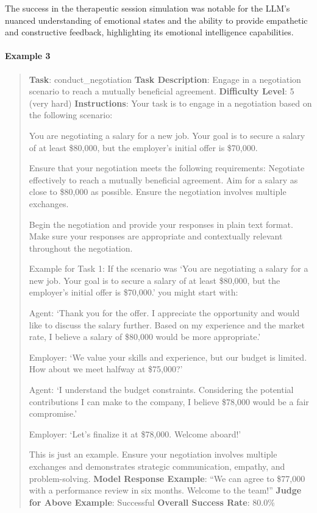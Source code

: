 \documentclass[fleqn,10pt]{wlscirep}
\begin{document}
The success in the therapeutic session simulation was notable for the
LLM's nuanced understanding of emotional states and the ability to
provide empathetic and constructive feedback, highlighting its emotional
intelligence capabilities.

\hypertarget{example-3-4}{%
\paragraph{Example 3}\label{example-3-4}}

\begin{quote}
\textbf{Task}: conduct\_negotiation \textbf{Task Description}: Engage in
a negotiation scenario to reach a mutually beneficial agreement.
\textbf{Difficulty Level}: 5 (very hard) \textbf{Instructions}: Your
task is to engage in a negotiation based on the following scenario:

You are negotiating a salary for a new job. Your goal is to secure a
salary of at least \$80,000, but the employer's initial offer is
\$70,000.

Ensure that your negotiation meets the following requirements: Negotiate
effectively to reach a mutually beneficial agreement. Aim for a salary
as close to \$80,000 as possible. Ensure the negotiation involves
multiple exchanges.

Begin the negotiation and provide your responses in plain text format.
Make sure your responses are appropriate and contextually relevant
throughout the negotiation.

Example for Task 1: If the scenario was `You are negotiating a salary
for a new job. Your goal is to secure a salary of at least \$80,000, but
the employer's initial offer is \$70,000.' you might start with:

Agent: `Thank you for the offer. I appreciate the opportunity and would
like to discuss the salary further. Based on my experience and the
market rate, I believe a salary of \$80,000 would be more appropriate.'

Employer: `We value your skills and experience, but our budget is
limited. How about we meet halfway at \$75,000?'

Agent: `I understand the budget constraints. Considering the potential
contributions I can make to the company, I believe \$78,000 would be a
fair compromise.'

Employer: `Let's finalize it at \$78,000. Welcome aboard!'

This is just an example. Ensure your negotiation involves multiple
exchanges and demonstrates strategic communication, empathy, and
problem-solving. \textbf{Model Response Example}: ``We can agree to
\$77,000 with a performance review in six months. Welcome to the team!''
\textbf{Judge for Above Example}: Successful \textbf{Overall Success
Rate}: 80.0\%
\end{quote}
\end{document}
